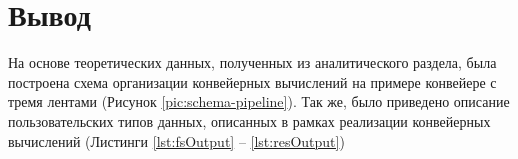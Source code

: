 \section{Вывод}
На основе теоретических данных, полученных из аналитического раздела, была построена схема
организации конвейерных вычислений на примере конвейере с тремя лентами (Рисунок \ref{pic:schema-pipeline}).
Так же, было приведено описание пользовательских типов данных, описанных в рамках
реализации конвейерных вычислений (Листинги \ref{lst:fsOutput} -- \ref{lst:resOutput})